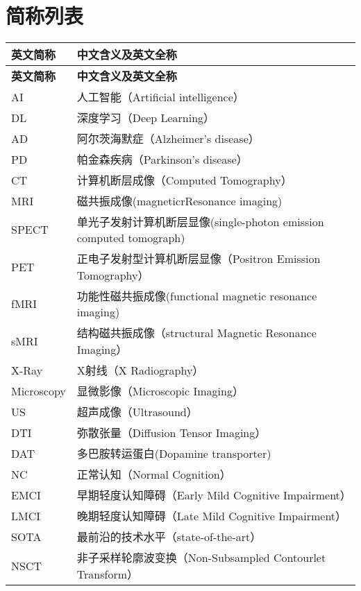 \chapter{简称列表}
  
\begin{longtable}{p{2.5cm}<{\centering}p{10.0cm}<{\centering}}
  \hline
  \textbf{英文简称} & \textbf{中文含义及英文全称}  \\  \hline
  \endfirsthead %
  \hline
  \textbf{英文简称} & \textbf{中文含义及英文全称} \\ %
  \hline
  \endhead
AI & 人工智能（Artificial intelligence）   \\ 
DL & 深度学习（Deep Learning） \\ 
AD    &阿尔茨海默症（Alzheimer's disease）    \\ 
PD    & 帕金森疾病（Parkinson's disease）  \\
CT  & 计算机断层成像（Computed Tomography）    \\
MRI    &磁共振成像(magneticrResonance imaging)    \\ 
SPECT  & 单光子发射计算机断层显像(single-photon emission computed tomograph)    \\
PET  & 正电子发射型计算机断层显像（Positron Emission Tomography）    \\ 
fMRI  & 功能性磁共振成像(functional magnetic resonance imaging)    \\
sMRI  &结构磁共振成像（structural Magnetic Resonance Imaging）    \\
X-Ray  &X射线（X Radiography） \\
Microscopy    &显微影像（Microscopic Imaging）    \\
 US   &超声成像（Ultrasound）    \\
DTI  &弥散张量（Diffusion Tensor Imaging）     \\
DAT  &多巴胺转运蛋白(Dopamine transporter)     \\
NC  & 正常认知（Normal Cognition）    \\
EMCI  & 早期轻度认知障碍（Early Mild Cognitive Impairment）    \\
LMCI  & 晚期轻度认知障碍（Late Mild Cognitive Impairment）    \\
SOTA  &最前沿的技术水平（state-of-the-art）     \\
 NSCT   &非子采样轮廓波变换（Non-Subsampled Contourlet Transform）    \\

\end{longtable}
